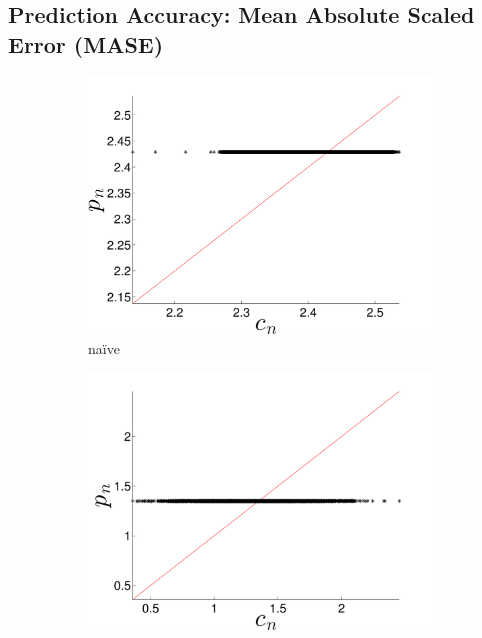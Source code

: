 \subsection{Prediction Accuracy: Mean Absolute Scaled Error (MASE)}
\label{sec:accuracy}

\begin{figure}[htbp]
  \centering
      \begin{subfigure}{0.49\textwidth}
    \includegraphics[width=\textwidth]{figs/colMeanForecast}
    \caption{\col na\"ive }
    \label{fig:gccMEAN}
  \end{subfigure}%
   \begin{subfigure}{0.49\textwidth}
    \includegraphics[width=\textwidth]{figs/gccMeanForecast}

\end{subfigure}
\end{figure}
